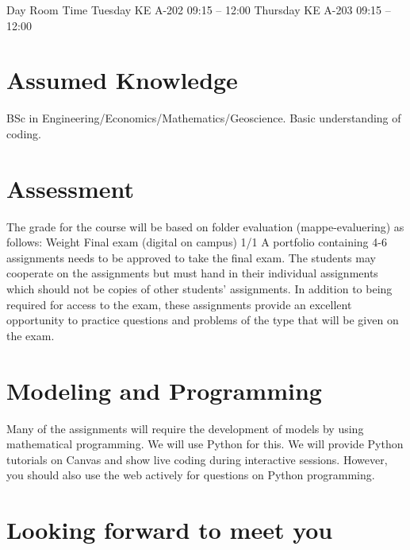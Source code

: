 \documentclass[letterpaper,12pt,oneside]{article}
\begin{document}
Day Room Time
Tuesday KE A-202 09:15 – 12:00
Thursday KE A-203 09:15 – 12:00


\section*{Assumed Knowledge}
 
BSc in Engineering/Economics/Mathematics/Geoscience. Basic understanding of coding.

\section*{Assessment}

The grade for the course will be based on folder evaluation (mappe-evaluering) as follows:
Weight
Final exam (digital on campus) 1/1
A portfolio containing 4-6 assignments needs to be approved to take the final exam. The students
may cooperate on the assignments but must hand in their individual assignments which should
not be copies of other students’ assignments.
In addition to being required for access to the exam, these assignments provide an excellent
opportunity to practice questions and problems of the type that will be given on the exam.


\section*{Modeling and Programming}

Many of the assignments will require the development of models by using mathematical
programming. We will use Python for this. We will provide Python tutorials on Canvas and show
live coding during interactive sessions. However, you should also use the web actively for questions
on Python programming.

 
 \vspace{4em}
\section*{Looking forward to meet you}
\end{document}
